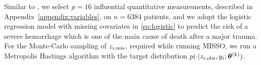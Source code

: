\documentclass[11pt]{article}
\theoremstyle{t}
\begin{document}
Similar to \citep{jiang2018logistic}, we select $p = 16$ influential quantitative measurements, described in Appendix~\ref{appendix:variables}, on $n = 6384$ patients, and we adopt
the logistic regression model with missing covariates in \eqref{eq:logistic} to predict the risk of a severe hemorrhage which is one of the main cause of death after a major trauma.
For the Monte-Carlo sampling of $z_{i,\mis}$, required while running MISSO, we run a Metropolis Hastings algorithm with the target distribution $p( \cdot |z_{i,\obs}, y_i; \hp{k})$.
\end{document}
